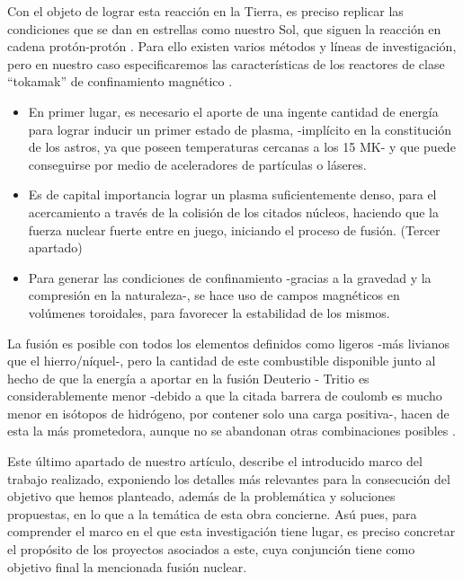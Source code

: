 Con el objeto de lograr esta reacción en la Tierra, es preciso replicar las condiciones que se dan en estrellas como nuestro Sol, que siguen la reacción en cadena protón-protón \cite{42}. Para ello existen varios métodos y líneas de investigación, pero en nuestro caso especificaremos las características de los reactores de clase “tokamak” de confinamiento magnético \cite{43,44}.

\begin{itemize}
    \item En primer lugar, es necesario el aporte de una ingente cantidad de energía para lograr inducir un primer estado de plasma, -implícito en la constitución de los astros, ya que poseen temperaturas cercanas a los 15 MK- y que puede conseguirse por medio de aceleradores de partículas o láseres.
    
    \item Es de capital importancia lograr un plasma suficientemente denso, para el acercamiento a través de la colisión de los citados núcleos, haciendo que la fuerza nuclear fuerte entre en juego, iniciando el proceso de fusión. (Tercer apartado)
    
    \item Para generar las condiciones de confinamiento -gracias a la gravedad y la compresión en la naturaleza-, se hace uso de campos magnéticos en volúmenes toroidales, para favorecer la estabilidad de los mismos.
\end{itemize}

La fusión es posible con todos los elementos definidos como ligeros -más livianos que el hierro/níquel-, pero la cantidad de este combustible disponible junto al hecho de que la energía a aportar en la fusión Deuterio - Tritio es considerablemente menor -debido a que la citada barrera de coulomb es mucho menor en isótopos de hidrógeno, por contener solo una carga positiva-, hacen de esta la más prometedora, aunque no se abandonan otras combinaciones posibles \cite{45}. 

Este último apartado de nuestro artículo, describe el introducido marco del trabajo realizado, exponiendo los detalles más relevantes para la consecución del objetivo que hemos planteado, además de la problemática y soluciones propuestas, en lo que a la temática de esta obra concierne. Asú pues, para comprender el marco en el que esta investigación tiene lugar, es preciso concretar el propósito de los proyectos asociados a este, cuya conjunción tiene como objetivo final la mencionada fusión nuclear.

